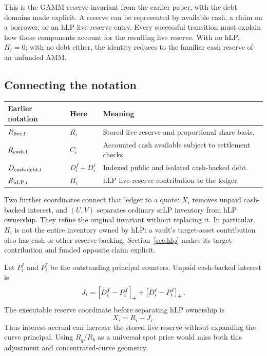 This is the GAMM reserve invariant from the earlier paper, with the debt domains made explicit. A reserve can be represented by available cash, a claim on a borrower, or an hLP live-reserve entry. Every successful transition must explain how those components account for the resulting live reserve. With no hLP, $H_i=0$; with no debt either, the identity reduces to the familiar cash reserve of an unfunded AMM.

\subsection{Connecting the notation}

\begin{center}\small
\begin{tabularx}{\linewidth}{@{}llX@{}}
\toprule
Earlier notation & Here & Meaning \\
\midrule
$R_{\rm live,i}$ & $R_i$ & Stored live reserve and proportional share basis. \\
$R_{\rm cash,i}$ & $C_i$ & Accounted cash available subject to settlement checks. \\
$D_{\rm cash\text{-}debt,i}$ & $D_i^f+D_i^\ell$ & Indexed public and isolated cash-backed debt. \\
$R_{\rm hLP,i}$ & $H_i$ & hLP live-reserve contribution to the ledger. \\
\bottomrule
\end{tabularx}\end{center}

Two further coordinates connect that ledger to a quote: $X_i$ removes unpaid cash-backed interest, and $(U,V)$ separates ordinary srLP inventory from hLP ownership. They refine the original invariant without replacing it. In particular, $H_i$ is not the entire inventory owned by hLP: a vault's target-asset contribution also has cash or other reserve backing. Section~\ref{sec:hlp} makes its target contribution and funded opposite claim explicit.

Let $P_i^f$ and $P_i^\ell$ be the outstanding principal counters. Unpaid cash-backed interest is
\begin{equation}
J_i=\left[D_i^f-P_i^f\right]_++\left[D_i^\ell-P_i^\ell\right]_+.
\end{equation}
The executable reserve coordinate before separating hLP ownership is
\begin{equation}
X_i=R_i-J_i.
\label{eq:principal}
\end{equation}
Thus interest accrual can increase the stored live reserve without expanding the curve principal. Using $R_q/R_b$ as a universal spot price would miss both this adjustment and concentrated-curve geometry.

